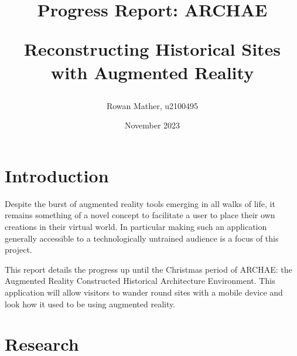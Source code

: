 \documentclass{article}
\title{Progress Report: ARCHAE \par
Reconstructing Historical Sites with Augmented Reality}
\author{Rowan Mather, u2100495}
\date{November 2023}
\begin{document}
\maketitle

\section{Introduction}
Despite the burst of augmented reality tools emerging in all walks of life, it remains something of a novel concept to facilitate a user to place their own creations in their virtual world. In particular making such an application generally accessible to a technologically untrained audience is a focus of this project. 

This report details the progress up until the Christmas period of ARCHAE: the Augmented Reality Constructed Historical Architecture Environment. This application will allow visitors to wander round sites with a mobile device and look how it used to be using augmented reality. 



\section{Research}


    
\end{document}
